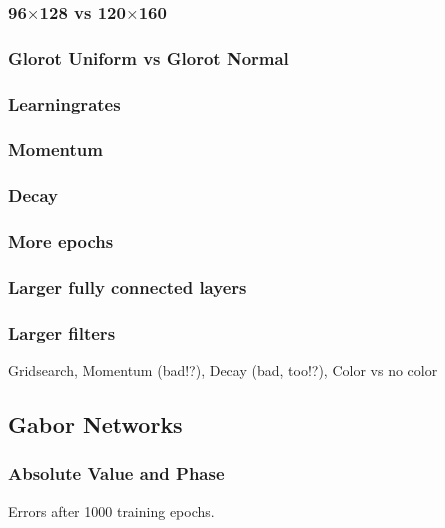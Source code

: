 \documentclass[11pt, a4paper]{article}
\begin{document}
\subsubsection{96$\times$128 vs 120$\times$160}

\subsubsection{Glorot Uniform vs Glorot Normal}

\subsubsection{Learningrates}

\subsubsection{Momentum}

\subsubsection{Decay}

\subsubsection{More epochs}

\subsubsection{Larger fully connected layers}

\subsubsection{Larger filters}

Gridsearch, Momentum (bad!?), Decay (bad, too!?), Color vs no color

\subsection{Gabor Networks}

\subsubsection{Absolute Value and Phase}

Errors after 1000 training epochs.
\end{document}
